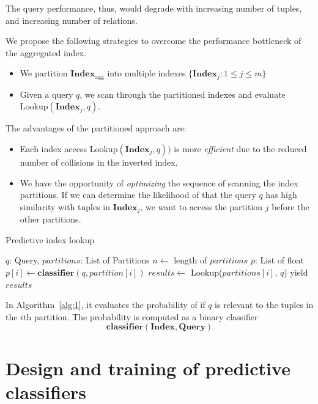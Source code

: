 \documentclass[conference]{IEEEtran}
\begin{document}
The query performance, thus, would degrade with increasing number of tuples, and increasing number of relations.

We propose the following strategies to overcome the performance bottleneck
of the aggregated index.

\begin{itemize}
\item We partition $\mathbf{Index}_\mathrm{agg}$ into multiple indexes
  $\{\mathbf{Index}_j: 1 \leq j \leq m\}$
\item Given a query $q$, we scan through the partitioned indexes
  and evaluate $\mathrm{Lookup}(\mathbf{Index}_j, q)$.
\end{itemize}

The advantages of the partitioned approach are:

\begin{itemize}
\item Each index access $\mathrm{Lookup}(\mathbf{Index}_j, q))$ is 
more {\em efficient} due to the reduced number of collisions in
the inverted index.

\item We have the opportunity of {\em optimizing} the sequence of scanning
the index partitions.  If we can determine the likelihood
of that the query $q$ has high similarity with tuples in $\mathbf{Index}_j$, we want
to access the partition $j$ before the other partitions.
\end{itemize}

\begin{algorithm}
\caption{Predictive index lookup}
\begin{algorithmic}[1]
\REQUIRE $q$: Query, $partitions$: List of Partitions
\STATE $n \leftarrow$ length of $partitions$
\STATE $p$: List of float
  \STATE $p[i] \leftarrow \mathbf{classifier}(q, partition[i])$
\ENDFOR
{}
    \STATE $results \leftarrow$ Lookup($partitions[i]$, $q$)
    \STATE yield $results$
\ENDFOR
\end{algorithmic}
\label{alg:1}
\end{algorithm}

In Algorithm~\ref{alg:1}, it evaluates the probability of if $q$
is relevant to the tuples in the $i$th partition.  The probability
is computed as a binary classifier 
$$\mathbf{classifier}(\mathbf{Index}, \mathbf{Query})$$

\section{Design and training of predictive classifiers}
\end{document}
